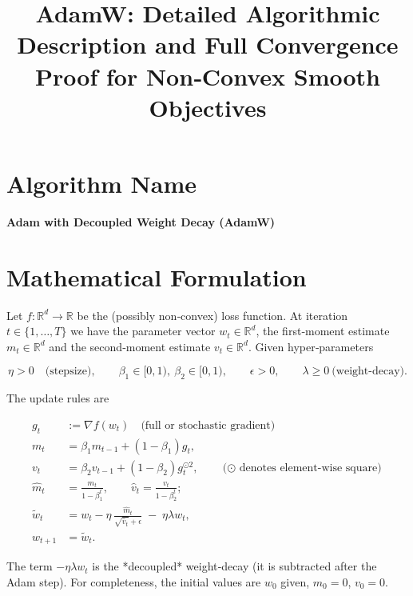 \documentclass{article}
\newcommand{\R}{\mathbb{R}}
\begin{document}
\title{AdamW: Detailed Algorithmic Description and Full Convergence Proof for Non‑Convex Smooth Objectives}
\author{}
\date{}
\maketitle

\section*{Algorithm Name}
\textbf{Adam with Decoupled Weight Decay (AdamW)}  

\section*{Mathematical Formulation}
Let $f:\R^{d}\rightarrow\R$ be the (possibly non‑convex) loss function.  
At iteration $t\in\{1,\dots,T\}$ we have the parameter vector $w_t\in\R^{d}$, the first‑moment estimate $m_t\in\R^{d}$ and the second‑moment estimate $v_t\in\R^{d}$.  
Given hyper‑parameters  

\[
\eta>0\quad\text{(stepsize)},\qquad 
\beta_1\in[0,1),\ \beta_2\in[0,1),\qquad 
\epsilon>0,\qquad 
\lambda\ge 0\ \text{(weight‑decay)} .
\]

The update rules are  

\[
\begin{aligned}
g_t &:= \nabla f(w_t) \quad\text{(full or stochastic gradient)}\\[4pt]
m_t &= \beta_1 m_{t-1} + (1-\beta_1) g_t,\\[4pt]
v_t &= \beta_2 v_{t-1} + (1-\beta_2) g_t^{\odot 2},\qquad 
\text{($\odot$ denotes element‑wise square)}\\[4pt]
\hat m_t &= \frac{m_t}{1-\beta_1^{t}},\qquad 
\hat v_t = \frac{v_t}{1-\beta_2^{t}};\\[4pt]
\tilde w_t &= w_t - \eta\,
\frac{\hat m_t}{\sqrt{\hat v_t}+\epsilon}\;-\;\eta\lambda w_t,\\[4pt]
w_{t+1} &= \tilde w_t .
\end{aligned}
\]

The term $-\eta\lambda w_t$ is the *decoupled* weight‑decay (it is subtracted after the Adam step).  
For completeness, the initial values are $w_0$ given, $m_0=0$, $v_0=0$.

\end{document}
